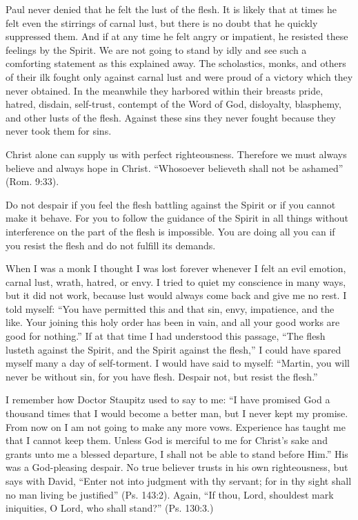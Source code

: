 Paul never denied that he felt the lust of the flesh. It is likely that at times he felt even the stirrings of carnal lust, but there is no doubt that he quickly suppressed them. And if at any time he felt angry or impatient, he resisted these feelings by the Spirit. We are not going to stand by idly and see such a comforting statement as this explained away. The scholastics, monks, and others of their ilk fought only against carnal lust and were proud of a victory which they never obtained. In the meanwhile they harbored within their breasts pride, hatred, disdain, self-trust, contempt of the Word of God, disloyalty, blasphemy, and other lusts of the flesh. Against these sins they never fought because they never took them for sins.

Christ alone can supply us with perfect righteousness. Therefore we must always believe and always hope in Christ. “Whosoever believeth shall not be ashamed” (Rom. 9:33).

Do not despair if you feel the flesh battling against the Spirit or if you cannot make it behave. For you to follow the guidance of the Spirit in all things without interference on the part of the flesh is impossible. You are doing all you can if you resist the flesh and do not fulfill its demands.

When I was a monk I thought I was lost forever whenever I felt an evil emotion, carnal lust, wrath, hatred, or envy. I tried to quiet my conscience in many ways, but it did not work, because lust would always come back and give me no rest. I told myself: “You have permitted this and that sin, envy, impatience, and the like. Your joining this holy order has been in vain, and all your good works are good for nothing.” If at that time I had understood this passage, “The flesh lusteth against the Spirit, and the Spirit against the flesh,” I could have spared myself many a day of self-torment. I would have said to myself: “Martin, you will never be without sin, for you have flesh. Despair not, but resist the flesh.”

I remember how Doctor Staupitz used to say to me: “I have promised God a thousand times that I would become a better man, but I never kept my promise. From now on I am not going to make any more vows. Experience has taught me that I cannot keep them. Unless God is merciful to me for Christ’s sake and grants unto me a blessed departure, I shall not be able to stand before Him.” His was a God-pleasing despair. No true believer trusts in his own righteousness, but says with David, “Enter not into judgment with thy servant; for in thy sight shall no man living be justified” (Ps. 143:2). Again, “If thou, Lord, shouldest mark iniquities, O Lord, who shall stand?” (Ps. 130:3.)

